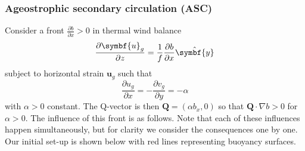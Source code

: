 \documentclass{jknotes}
\begin{document}
\subsubsection{Ageostrophic secondary circulation (ASC)}
Consider a front $\frac{\partial b}{\partial x} > 0$ in thermal wind balance
\begin{equation}
	\frac{\partial \symbf{u}_g}{\partial z} = \inv{f}\frac{\partial
	b}{\partial x}\hat{\symbf{y}}
\end{equation}
subject to horizontal strain $\symbf{u}_g$ such that
\begin{equation}
	\frac{\partial u_g}{\partial x} = -\frac{\partial v_g}{\partial y} =
	-\alpha
\end{equation}
with $\alpha > 0$ constant. The Q-vector is then $\symbf{Q} = (\alpha b_x, 0)$
so that $\symbf{Q} \cdot \nabla b > 0$ for $\alpha > 0$. The influence of this
front is as follows. Note that each of these influences happen simultaneously,
but for clarity we consider the consequences one by one. Our initial set-up is
shown below with red lines representing buoyancy surfaces.\\
\begin{center}
\hspace{.35in}
\end{center}
\end{document}
